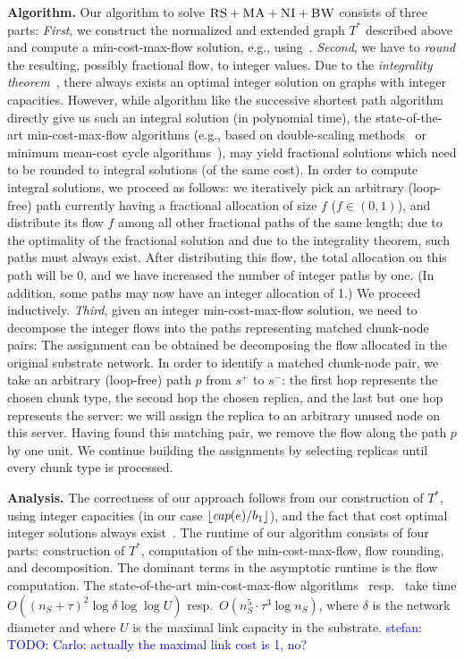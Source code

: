 \documentclass[9pt]{sigcomm-alternate}
\newcommand{\stefan}[1]{\textcolor{blue}{stefan: #1}}
\newcommand{\Source}{\ensuremath{s^{+}}}
\newcommand{\Sink}{\ensuremath{s^{-}}}
\newcommand{\capacity}{\emph{cap}}
\newcommand{\CC}{\textsc{NI}}
\newcommand{\RS}{\textsc{RS}}
\newcommand{\BW}{\textsc{BW}}
\newcommand{\MA}{\textsc{MA}}
\newcommand{\Tree}{\ensuremath{T}}
\newcommand{\CostTrans}{\ensuremath{b_1}}
\begin{document}
\textbf{Algorithm.}
Our algorithm to solve $\RS+\MA+\CC+\BW$ consists of three parts:
\emph{First}, we construct the normalized and extended graph $\Tree^*$
described above and compute
a min-cost-max-flow solution, e.g., using~\cite{mincostmaxflow-1,mincostmaxflow-2}.
\emph{Second}, we have to \emph{round} the resulting, possibly fractional flow, to
integer values. Due to the \emph{integrality theorem}~\cite{mincostmaxflow-1,mincostmaxflow-2},
there always exists an optimal integer solution on graphs with integer capacities.
However, while algorithm like the successive shortest path algorithm~\cite{successive_shortest_path_complexity}
directly give us such an integral solution (in polynomial time), the state-of-the-art min-cost-max-flow algorithms (e.g., based on double-scaling
methods~\cite{mincostmaxflow-1} or minimum mean-cost cycle algorithms~\cite{mincostmaxflow-2}), may yield fractional solutions
which need to be rounded to integral solutions (of the same cost).
In order to compute integral solutions, we proceed as follows: we iteratively pick an arbitrary (loop-free) path
currently having a fractional allocation of size $f$ ($f\in (0,1)$), and distribute its flow $f$
among all other fractional paths of the same length; due to the optimality of the fractional solution
and due to the integrality theorem, such paths must always exist. After distributing this flow,
the total allocation on this path will be 0, and we have increased the number of integer paths by one.
(In addition, some paths may now have an integer allocation of 1.) We proceed inductively.
\emph{Third}, given an integer min-cost-max-flow solution, we need to decompose the integer flows into the paths
representing matched chunk-node pairs:
The assignment can be obtained be decomposing the flow allocated in the
original substrate network. In order to identify a matched chunk-node pair,
we take an arbitrary (loop-free) path $p$ from $\Source$ to $\Sink$:
the first hop represents the chosen chunk type, the second hop the chosen
replica, and the last but one hop represents the server: we will assign
the replica to an arbitrary unused node on this server.
Having found this matching pair, we remove the flow
along the path $p$ by one unit.
We continue building the assignments by selecting replicas until every chunk type is processed.

\textbf{Analysis.}
The correctness of our approach follows from our construction
of $\Tree^*$, using integer capacities (in our case $\lfloor\capacity(e)/\CostTrans\rfloor$),
and the fact that cost optimal integer solutions always exist~\cite{mincostmaxflow-1,mincostmaxflow-2}.
The runtime of our algorithm consists of four parts: construction of $\Tree^*$,
computation of the min-cost-max-flow, flow rounding, and decomposition. The
dominant terms in the asymptotic runtime is the flow computation.
The state-of-the-art min-cost-max-flow algorithms~\cite{mincostmaxflow-1} resp.~\cite{mincostmaxflow-2}
take time $O((n_S+\tau)^2 \log \delta \log\log U)$ resp.~$O(n_S^5 \cdot \tau^3 \log n_S)$, where $\delta$ is the
network diameter and where $U$ is the maximal link capacity in the substrate.
\stefan{TODO: Carlo: actually the maximal link cost is 1, no?}
\end{document}
